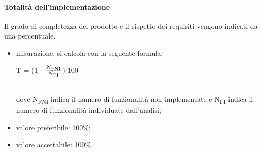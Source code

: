 \paragraph{Totalità dell'implementazione}
			Il grado di completezza del prodotto e il rispetto dei requisiti vengono indicati da una percentuale.
			\begin{itemize}
			\item misurazione: si calcola con la seguente formula: \\
			\centerline { T = (1 - \(\frac{N\textsubscript{FNI}}{N\textsubscript{FI}} \))$ \cdot  100$ } \\
			dove N\textsubscript{FNI} indica il numero di funzionalità non implementate e N\textsubscript{FI} indica il numero di funzionalità individuate dall'analisi;
			\item valore preferibile: 100\%;
			\item valore accettabile: 100\%.
			\end{itemize}